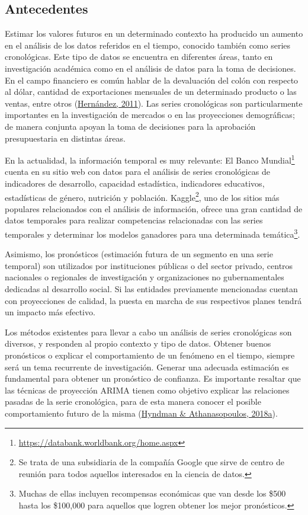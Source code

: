 \documentclass[
]{article}
\begin{document}
\subsection{Antecedentes}

Estimar los valores futuros en un determinado contexto ha producido un
aumento en el análisis de los datos referidos en el tiempo, conocido
también como series cronológicas. Este tipo de datos se encuentra en
diferentes áreas, tanto en investigación académica como en el análisis
de datos para la toma de decisiones. En el campo financiero es común
hablar de la devaluación del colón con respecto al dólar, cantidad de
exportaciones mensuales de un determinado producto o las ventas, entre
otros (\protect\hyperlink{ref-oscarh-1}{Hernández, 2011}). Las series
cronológicas son particularmente importantes en la investigación de
mercados o en las proyecciones demográficas; de manera conjunta apoyan
la toma de decisiones para la aprobación presupuestaria en distintas
áreas.

En la actualidad, la información temporal es muy relevante: El Banco
Mundial\footnote{\url{https://databank.worldbank.org/home.aspx}} cuenta
en su sitio web con datos para el análisis de series cronológicas de
indicadores de desarrollo, capacidad estadística, indicadores
educativos, estadísticas de género, nutrición y población.
Kaggle\footnote{Se trata de una subsidiaria de la compañía Google que
  sirve de centro de reunión para todos aquellos interesados en la
  ciencia de datos.}, uno de los sitios más populares relacionados con
el análisis de información, ofrece una gran cantidad de datos temporales
para realizar competencias relacionadas con las series temporales y
determinar los modelos ganadores para una determinada
temática\footnote{Muchas de ellas incluyen recompensas económicas que
  van desde los \$500 hasta los \$100,000 para aquellos que logren
  obtener los mejor pronósticos.}.

Asimismo, los pronósticos (estimación futura de un segmento en una serie
temporal) son utilizados por instituciones públicas o del sector
privado, centros nacionales o regionales de investigación y
organizaciones no gubernamentales dedicadas al desarrollo social. Si las
entidades previamente mencionadas cuentan con proyecciones de calidad,
la puesta en marcha de sus respectivos planes tendrá un impacto más
efectivo.

Los métodos existentes para llevar a cabo un análisis de series
cronológicas son diversos, y responden al propio contexto y tipo de
datos. Obtener buenos pronósticos o explicar el comportamiento de un
fenómeno en el tiempo, siempre será un tema recurrente de investigación.
Generar una adecuada estimación es fundamental para obtener un
pronóstico de confianza. Es importante resaltar que las técnicas de
proyección ARIMA tienen como objetivo explicar las relaciones pasadas de
la serie cronológica, para de esta manera conocer el posible
comportamiento futuro de la misma
(\protect\hyperlink{ref-hyndman2018forecasting}{Hyndman \&
Athanasopoulos, 2018a}).
\end{document}
